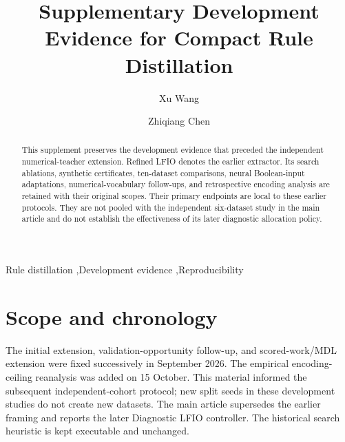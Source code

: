 \documentclass[a4paper,fleqn,review]{cas-sc}
\begin{document}
\title[mode=title]{Supplementary Development Evidence for Compact Rule Distillation}
\author[1,2,3]{Xu Wang}
\cormark[1]
\author[1,2,3]{Zhiqiang Chen}
\begin{abstract}
This supplement preserves the development evidence that preceded the independent numerical-teacher extension. Refined LFIO denotes the earlier extractor. Its search ablations, synthetic certificates, ten-dataset comparisons, neural Boolean-input adaptations, numerical-vocabulary follow-ups, and retrospective encoding analysis are retained with their original scopes. Their primary endpoints are local to these earlier protocols. They are not pooled with the independent six-dataset study in the main article and do not establish the effectiveness of its later diagnostic allocation policy.
\end{abstract}
\begin{keywords}Rule distillation \sep Development evidence \sep Reproducibility\end{keywords}
\maketitle
\section{Scope and chronology}
The initial extension, validation-opportunity follow-up, and scored-work/MDL extension were fixed successively in September 2026. The empirical encoding-ceiling reanalysis was added on 15 October. This material informed the subsequent independent-cohort protocol; new split seeds in these development studies do not create new datasets. The main article supersedes the earlier framing and reports the later Diagnostic LFIO controller. The historical search heuristic is kept executable and unchanged.
\end{document}
